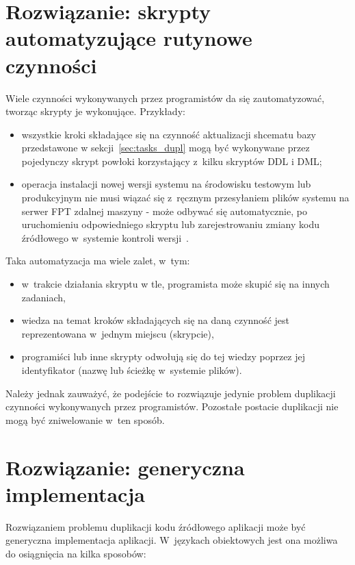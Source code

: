 \section{Rozwiązanie: skrypty automatyzujące rutynowe czynności}

Wiele czynności wykonywanych przez programistów da się zautomatyzować, tworząc skrypty je wykonujące.
Przykłady:

\begin{itemize}
 \item wszystkie kroki składające się na czynność aktualizacji shcematu bazy przedstawone w sekcji~\ref{sec:tasks_dupl} mogą być wykonywane przez pojedynczy skrypt powłoki korzystający z~kilku skryptów DDL i DML;
 \item operacja instalacji nowej wersji systemu na środowisku testowym lub produkcyjnym nie musi wiązać się z~ręcznym przesyłaniem plików systemu na serwer FPT zdalnej maszyny - może odbywać się automatycznie, po uruchomieniu odpowiedniego skryptu lub zarejestrowaniu zmiany kodu źródłowego w~systemie kontroli wersji~\cite{cont_delivery}.
\end{itemize}

Taka automatyzacja ma wiele zalet, w~tym:

\begin{itemize}
 \item w~trakcie działania skryptu w tle, programista może skupić się na innych zadaniach,
 \item wiedza na temat kroków składających się na daną czynność jest reprezentowana w~jednym miejscu (skrypcie),
 \item programiści lub inne skrypty odwołują się do tej wiedzy poprzez jej identyfikator (nazwę lub ścieżkę w~systemie plików).
\end{itemize}

Należy jednak zauważyć, że podejście to rozwiązuje jedynie problem duplikacji czynności wykonywanych przez programistów.
Pozostałe postacie duplikacji nie mogą być zniwelowanie w~ten sposób.



\section{Rozwiązanie: generyczna implementacja}

Rozwiązaniem problemu duplikacji kodu źródłowego aplikacji może być generyczna implementacja aplikacji.
W~językach obiektowych jest ona możliwa do osiągnięcia na kilka sposobów:


